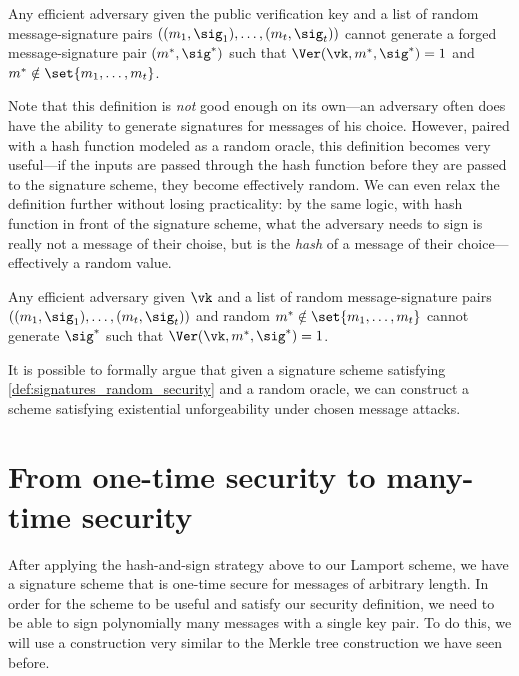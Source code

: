 \begin{definition}
Any efficient adversary given the public verification key and a list of random message-signature pairs $((m_1, \sig_1), \ldots, (m_t, \sig_t))$ cannot generate a forged
message-signature pair $(m^*, \sig^*)$ 
such that $\Ver(\vk, m^*, \sig^*) = 1$ and $m^* \notin \set{m_1, \ldots, m_t}$.

\end{definition}

Note that this definition is \emph{not} good enough on its own---an adversary often does have the ability to generate signatures for messages of his choice. However, paired with a hash function modeled as a random oracle, this definition becomes very useful---if the inputs are passed through the hash function before they are passed to the signature scheme, they become effectively random. We can even relax the definition further without losing practicality: by the same logic, with hash function in front of the signature scheme, what the adversary needs to sign is really not a message of their choise, but is the \emph{hash} of a message of their choice---effectively a random value.

\begin{definition} \label{def:signatures_random_security}
	Any efficient adversary given $\vk$ and a list of random message-signature pairs $((m_1, \sig_1), \ldots, (m_t, \sig_t))$ and random $m^* \notin \set{m_1, \ldots, m_t}$ cannot generate $\sig^*$ such that $\Ver(\vk, m^*, \sig^*) = 1$.
\end{definition}

It is possible to formally argue that given a signature scheme satisfying \cref{def:signatures_random_security} and a random oracle, we can construct a scheme satisfying existential unforgeability under chosen message attacks.

\section{From one-time security to many-time security}
\label{sec:sig:manytime}
After applying the hash-and-sign strategy above to our Lamport scheme, we
have a signature scheme that is one-time secure for messages of arbitrary
length. In order for the scheme to be useful and satisfy our security
definition, we need to be able to sign polynomially many messages with
a single key pair. To do this, we will use a construction very similar
to the Merkle tree construction we have seen before.

